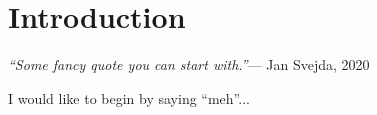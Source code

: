 \documentclass[../thesis.tex]{subfiles}
\begin{document}
\chapter*{Introduction}

\begin{displayquote}
\emph{``Some fancy quote you can start with.''}\hfill --- Jan Svejda, 2020
\end{displayquote}

I would like to begin by saying ``meh''...


\biblio
\end{document}
